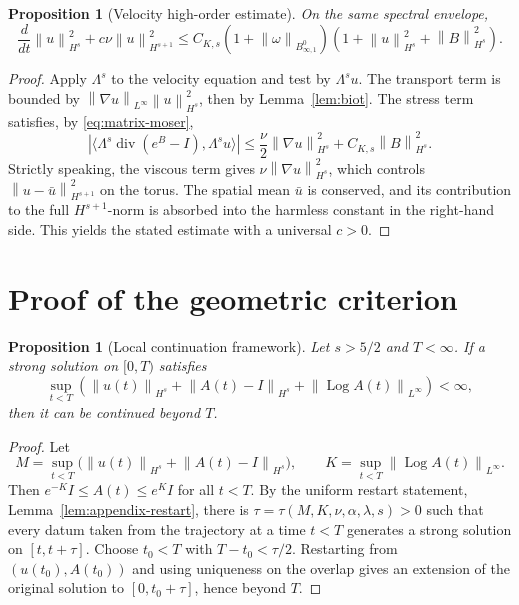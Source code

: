 \documentclass[11pt]{article}
\numberwithin{equation}{section}
\newtheorem{proposition}[theorem]{Proposition}
\newcommand{\Id}{I}
\newcommand{\divv}{\operatorname{div}}
\newcommand{\Log}{\operatorname{Log}}
\newcommand{\Besov}{B^0_{\infty,1}}
\newcommand{\norm}[1]{\left\lVert #1\right\rVert}
\begin{document}
\begin{proposition}[Velocity high-order estimate]
\label{prop:u-Hs}
On the same spectral envelope,
\begin{equation}
  \frac{d}{dt}\norm{u}_{H^s}^2+c\nu\norm{u}_{H^{s+1}}^2
  \le
  C_{K,s}(1+\norm{\omega}_{\Besov})
  (1+\norm{u}_{H^s}^2+\norm{B}_{H^s}^2).
  \label{eq:u-Hs}
\end{equation}
\end{proposition}

\begin{proof}
Apply \(\Lambda^s\) to the velocity equation and test by \(\Lambda^su\).  The
transport term is bounded by \(\norm{\nabla u}_{L^\infty}\norm{u}_{H^s}^2\),
then by Lemma~\ref{lem:biot}.  The stress term satisfies, by
\eqref{eq:matrix-moser},
\[
  \left|
  \langle\Lambda^s\divv(e^B-\Id),\Lambda^su\rangle
  \right|
  \le
  \frac{\nu}{2}\norm{\nabla u}_{H^s}^2
  +C_{K,s}\norm{B}_{H^s}^2 .
\]
Strictly speaking, the viscous term gives
\(\nu\norm{\nabla u}_{H^s}^2\), which controls
\(\norm{u-\bar u}_{H^{s+1}}^2\) on the torus.  The spatial mean
\(\bar u\) is conserved, and its contribution to the full
\(H^{s+1}\)-norm is absorbed into the harmless constant in the right-hand
side.  This yields the stated estimate with a universal \(c>0\).
\end{proof}

\section{Proof of the geometric criterion}

\begin{proposition}[Local continuation framework]
\label{prop:local}
Let \(s>5/2\) and \(T<\infty\).  If a strong solution on \([0,T)\) satisfies
\[
  \sup_{t<T}\left(
  \norm{u(t)}_{H^s}
  +\norm{A(t)-\Id}_{H^s}
  +\norm{\Log A(t)}_{L^\infty}
  \right)<\infty,
\]
then it can be continued beyond \(T\).
\end{proposition}

\begin{proof}
Let
\[
  M=\sup_{t<T}\bigl(\norm{u(t)}_{H^s}+\norm{A(t)-\Id}_{H^s}\bigr),
  \qquad
  K=\sup_{t<T}\norm{\Log A(t)}_{L^\infty}.
\]
Then \(e^{-K}\Id\le A(t)\le e^K\Id\) for all \(t<T\).  By the uniform restart
statement, Lemma~\ref{lem:appendix-restart}, there is
\(\tau=\tau(M,K,\nu,\alpha,\lambda,s)>0\) such that every datum taken from the
trajectory at a time \(t<T\) generates a strong solution on
\([t,t+\tau]\).  Choose \(t_0<T\) with \(T-t_0<\tau/2\).  Restarting from
\((u(t_0),A(t_0))\) and using uniqueness on the overlap gives an extension of
the original solution to \([0,t_0+\tau]\), hence beyond \(T\).
\end{proof}
\end{document}
